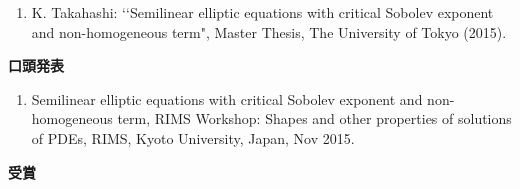 \begin{enumerate}
\item K. Takahashi: \lq\lq Semilinear elliptic equations with critical
      Sobolev exponent and non-homogeneous term",
      Master Thesis, The University of Tokyo (2015).
\end{enumerate}

\vspace{0.2cm}
\noindent
{\bf 口頭発表}

\vspace{0.1cm}

\begin{enumerate}
\item Semilinear elliptic equations with critical Sobolev exponent and non-homogeneous term, RIMS Workshop: Shapes and other properties of solutions of PDEs, RIMS, Kyoto University, Japan, Nov 2015.
\end{enumerate}





\vspace{0.2cm}
\noindent
{\bf 受賞}

\vspace{0.1cm}

